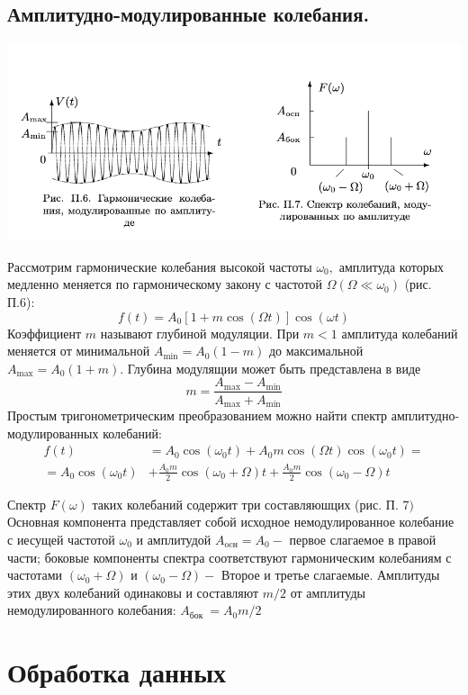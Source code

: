 \documentclass[a4paper, 12pt]{article}%
\begin{document}
\subsection{Амплитудно-модулированные колебания.}

\begin{center}
\includegraphics[width=0.7\linewidth]{./anat/4.jpg}\\
\end{center}
 Рассмотрим гармонические колебания высокой частоты $\omega_{0},$ амплитуда которых медленно меняется по гармоническому закону с частотой $\Omega\left(\Omega \ll \omega_{0}\right)$ (рис. П.6):
$$
f(t)=A_{0}[1+m \cos (\Omega t)] \cos (\omega t)
$$
Коэффициент $m$ называют глубиной модуляции. При $m<1$ амплитуда колебаний меняется от минимальной $A_{\min }=A_{0}(1-m)$ до максимальной $A_{\max }=A_{0}(1+m) .$ Глубина модулящии может быть представлена в виде
$$
m=\frac{A_{\max }-A_{\min }}{A_{\max }+A_{\min }}
$$
Простым тригонометрическим преобразованием можно найти спектр амплитудно-модулированных колебаний:
$$
\begin{aligned}
f(t) &=A_{0} \cos \left(\omega_{0} t\right)+A_{0} m \cos (\Omega t) \cos \left(\omega_{0} t\right)=\\
=A_{0} \cos \left(\omega_{0} t\right) &+\frac{A_{0} m}{2} \cos \left(\omega_{0}+\Omega\right) t+\frac{A_{0} m}{2} \cos \left(\omega_{0}-\Omega\right) t
\end{aligned}
$$

Спектр $F(\omega)$ таких колебаний содержит три составляюшцих (рис. П. 7$)$ Основная компонента представляет собой исходное немодулированное колебание с иесущей частотой $\omega_{0}$ и амплитудой $A_{\mathrm{ocн}}=A_{0}-$ первое слагаемое в правой части; боковые компоненты спектра соответствуют гармоническим колебаниям с частотами $\left(\omega_{0}+\Omega\right)$ и $\left(\omega_{0}-\Omega\right)-$ Второе и третье слагаемые. Амплитуды этих двух колебаний одинаковы и составляют $m / 2$ от амплитуды немодулированного колебания: $A_{\text {бок }}=A_{0} m / 2$


\section{Обработка данных}
\end{document}
